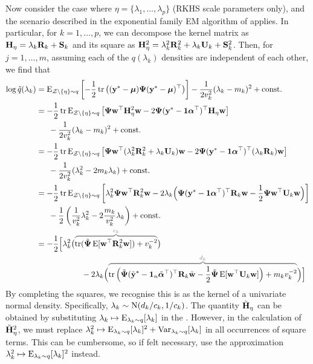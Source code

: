 Now consider the case where $\eta = \{\lambda_1,\dots,\lambda_p \}$ (RKHS scale parameters only), and the scenario described in the exponential family EM algorithm of  applies.
In particular, for $k=1,\dots,p$, we can decompose the kernel matrix as ${\mathbf H}_\eta = \lambda_k {\mathbf R}_k + {\mathbf S}_k$ and its square as ${\mathbf H}_\eta^2 = \lambda_k^2 {\mathbf R}_k^2 + \lambda_k {\mathbf U}_k + {\mathbf S}_k^2$.
Then, for $j = 1,\dots,m$, assuming each of the $q(\lambda_k)$ densities are independent of each other, we find that
\begin{align*}
  \log \tilde q(\lambda_k) 
  &= \E_{\cZ\backslash\{\eta\}\sim q} \left[ 
  - \half\tr \big((\by^* - \bmu) \bPsi (\by^* - \bmu)^\top  \big)
  \right] 
  - \frac{1}{2v_k^2} (\lambda_k - m_k)^2 + \const \\
  &= - \half\tr \E_{\cZ\backslash\{\eta\}\sim q} \left[ \bPsi\bw^\top \bH_\eta^2 \bw - 2\bPsi(\by^* - \bone\balpha^\top)^\top\bH_\eta \bw \right] \\
  &\phantom{==} - \frac{1}{2v_k^2} (\lambda_k - m_k)^2 + \const \\
  &= - \half\tr \E_{\cZ\backslash\{\eta\}\sim q} \left[ \bPsi\bw^\top (\lambda_k^2\bR_k^2 + \lambda_k\bU_k) \bw - 2\bPsi(\by^* - \bone\balpha^\top)^\top(\lambda_k\bR_k) \bw \right] \\
  &\phantom{==} - \frac{1}{2v_k^2} (\lambda_k^2 - 2m_k\lambda_k) + \const \\
  &= - \half\tr \E_{\cZ\backslash\{\eta\}\sim q} \left[ 
  \lambda_k^2\bPsi\bw^\top \bR_k^2 \bw 
  -2 \lambda_k \Big(
  \bPsi(\by^* - \bone\balpha^\top)^\top\bR_k \bw 
  -\half\bPsi\bw^\top \bU_k \bw
  \Big) \right] \\
  &\phantom{==} - \half\left(\frac{1}{v_k^2}\lambda_k^2  - 2 \frac{m_k}{v_k^2} \lambda_k \right) + \const \\
  &= -\half \Big[ 
 \lambda_k^2 \big( 
 \greyoverbrace{\tr(\tilde\bPsi\E[\bw^\top\bR_k^2\bw]) + v_k^{-2}}{c_k}
 \big) \\ 
  &\hspace{2cm} - 2\lambda_k \Big( 
  \greyoverbrace{
  \tr\Big( \tilde\bPsi(\tilde\by^* - \bone_n\tilde\balpha^\top)^\top\bR_k \tilde\bw 
  - \half\tilde\bPsi\E[\bw^\top \bU_k \bw] \Big) 
  + m_k v_k^{-2}}{d_k}
  \Big) \Big]
\end{align*}
By completing the squares, we recognise this is as the kernel of a univariate normal density. 
Specifically, $\lambda_k \sim \operatorname{N}(d_k/c_k,1/c_k)$.
The quantity $\tilde{{\mathbf H}}_\eta$ can be obtained by substituting $\lambda_k \mapsto \operatorname{E}_{\lambda_k\sim q}[\lambda_k]$ in the .
However, in the calculation of $\tilde{{\mathbf H}}_\eta^2$, we must replace $\lambda_k^2 \mapsto \operatorname{E}_{\lambda_k\sim q}[\lambda_k]^2 +  \operatorname{Var}_{\lambda_k\sim q}[\lambda_k]$ in all occurrences of square terms.
This can be cumbersome, so if felt necessary, use the approximation $\lambda_k^2 \mapsto \operatorname{E}_{\lambda_k\sim q}[\lambda_k]^2$ instead.

